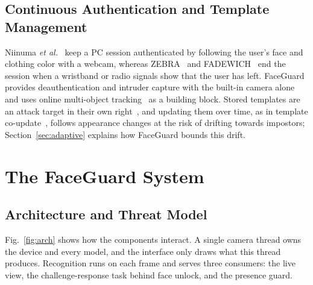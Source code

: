 \documentclass[journal]{IEEEtran}
\newcommand{\sys}{FaceGuard}
\begin{document}
\subsection{Continuous Authentication and Template Management}
Niinuma \emph{et al.}~\cite{niinuma2010soft} keep a PC session authenticated by following the user's face and clothing color with a webcam, whereas ZEBRA~\cite{mare2014zebra} and FADEWICH~\cite{conti2017fadewich} end the session when a wristband or radio signals show that the user has left. \sys{} provides deauthentication and intruder capture with the built-in camera alone and uses online multi-object tracking~\cite{bewley2016sort} as a building block. Stored templates are an attack target in their own right~\cite{ratha2001enhancing}, and updating them over time, as in template co-update~\cite{rattani2008coupdate}, follows appearance changes at the risk of drifting towards impostors; Section~\ref{sec:adaptive} explains how \sys{} bounds this drift.

\section{The \sys{} System}\label{sec:system}

\subsection{Architecture and Threat Model}
Fig.~\ref{fig:arch} shows how the components interact. A single camera thread owns the device and every model, and the interface only draws what this thread produces. Recognition runs on each frame and serves three consumers: the live view, the challenge-response task behind face unlock, and the presence guard.
\end{document}
